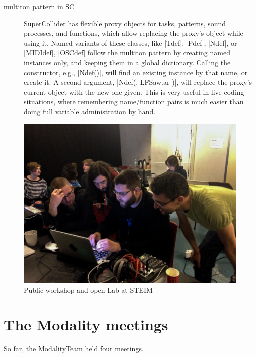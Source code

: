 \documentclass{article}
\begin{document}
\begin{description}
	\item[multiton pattern in SC] 
		SuperCollider has flexible proxy objects for tasks, patterns, sound processes, and functions, which allow replacing the proxy's object while using it.
		Named variants of these classes, like |Tdef|, |Pdef|, |Ndef|, or |MIDIdef|, |OSCdef| follow the multiton pattern by creating named instances only, and keeping them in a global dictionary. 
		Calling the constructor, e.g., |Ndef(\a)|, will find an existing instance by that name, or create it. 
		A second argument, |Ndef(\a, { LFSaw.ar })|, will replace the proxy's current object with the new one given. This is very useful in live coding situations, where remembering name/function pairs is much easier than doing full  variable administration by hand.
\end{description}


\begin{figure}[h]
	\centering
		\includegraphics[width=.9\columnwidth]{../media/20140403-IMG_1667.jpg}
	\caption{Public workshop and open Lab at STEIM}
	\label{fig:media_20140403-IMG_1667}
\end{figure}




\section{The Modality meetings}
\label{sec:the_modality_meetings}

So far, the ModalityTeam held four meetings.
\end{document}
